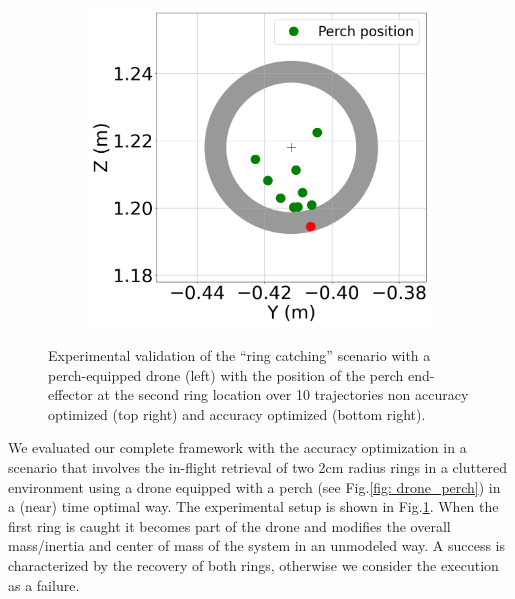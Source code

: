 \begin{figure} [t]
\begin{subfigure}{0.37\linewidth}
        \includegraphics[width=\linewidth]{figures/robust_accurate/Exp_ring_opti_full_zoom.png}
      \end{subfigure}\hfill
      
    \caption{Experimental validation of the ``ring catching'' scenario with a perch-equipped drone (left) with the position of the perch end-effector at the second ring location over 10 trajectories non accuracy optimized (top right) and accuracy optimized (bottom right).}
    \label{fig: exp ring}
  \end{figure}

We evaluated our complete framework with the accuracy optimization in a scenario that involves the in-flight retrieval of two 2cm radius rings in a cluttered environment using a drone equipped with a perch (see Fig.\ref{fig: drone_perch}) in a (near) time optimal way.
The experimental setup is shown in Fig.\ref{fig: exp ring}.
When the first ring is caught it becomes part of the drone and modifies the overall mass/inertia and center of mass of the system in an unmodeled way. 
A success is characterized by the recovery of both rings, otherwise we consider the execution as a failure.


